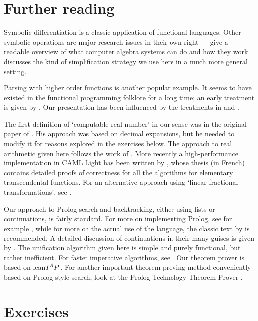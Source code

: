 \section*{Further reading}

Symbolic differentiation is a classic application of functional languages.
Other symbolic operations are major research issues in their own right ---
 give a readable overview of what computer algebra systems
can do and how they work.  discusses the kind of
simplification strategy we use here in a much more general setting.

Parsing with higher order functions is another popular example. It seems to
have existed in the functional programming folklore for a long time; an early
treatment is given by . Our presentation has been
influenced by the treatments in  and .

The first definition of `computable real number' in our sense was in the
original paper of . His approach was based on decimal expansions,
but he needed to modify it \cite{turing2} for reasons explored in the exercises
below. The approach to real arithmetic given here follows the work of
. More recently a high-performance implementation in
CAML Light has been written by , whose thesis (in French)
contains detailed proofs of correctness for all the algorithms for elementary
transcendental functions. For an alternative approach using `linear fractional
transformations', see .

Our approach to Prolog search and backtracking, either using lists or
continuations, is fairly standard. For more on implementing Prolog, see for
example , while for more on the actual use of the
language, the classic text by  is recommended. A
detailed discussion of continuations in their many guises is given by
. The unification algorithm given here is simple
and purely functional, but rather inefficient. For faster imperative
algorithms, see . Our theorem prover is based on
\mbox{{\sf lean}$T^{\!\!\textstyle A}\!\!P$} \cite{beckert-posegga}. For
another important theorem proving method conveniently based on Prolog-style
search, look at the Prolog Technology Theorem Prover \cite{stickel-pttp}.

\section*{Exercises}

